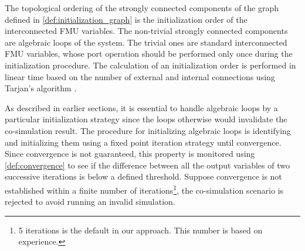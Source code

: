 The topological ordering of the strongly connected components of the graph defined in \cref{def:initialization_graph} is the initialization order of the interconnected FMU variables. 
The non-trivial strongly connected components are algebraic loops of the system. The trivial ones are standard interconnected FMU variables, whose port operation should be performed only once during the initialization procedure.
The calculation of an initialization order is performed in linear time based on the number of external and internal connections using Tarjan's algorithm \cite{tarjan_1972}. 

As described in earlier sections, it is essential to handle algebraic loops by a particular initialization strategy since the loops otherwise would invalidate the co-simulation result. The procedure for initializing algebraic loops is identifying and initializing them using a fixed point iteration strategy until convergence. Since convergence is not guaranteed, this property is monitored using \cref{def:convergence} to see if the difference between all the output variables of two successive iterations is below a defined threshold. Suppose convergence is not established within a finite number of iterations\footnote{5 iterations is the default in our approach. This number is based on experience.}, the co-simulation scenario is rejected to avoid running an invalid simulation.

